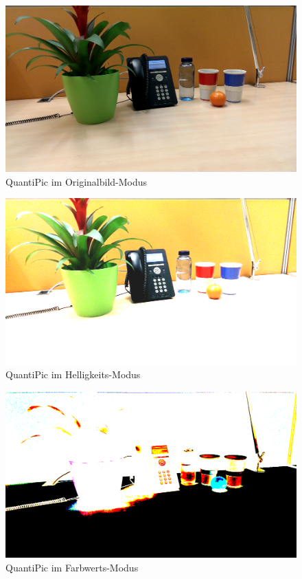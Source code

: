 \begin{landscape}
\begin{figure}[h]
	\centering
		\includegraphics[width=1.4\textwidth]{img/Fotos/QuantiPic_Original.png}
	\caption[QuantiPic Originalbild]{QuantiPic im Originalbild-Modus}
	\label{fig:quanti_orig}
\end{figure}

\begin{figure}[h]
	\centering
		\includegraphics[width=1.4\textwidth]{img/Fotos/QuantiPic_Helligkeit.png}
	\caption[QuantiPic Helligkeit]{QuantiPic im Helligkeits-Modus}
	\label{fig:quanti_hell}
\end{figure}

\begin{figure}[h]
	\centering
		\includegraphics[width=1.4\textwidth]{img/Fotos/QuantiPic_Farbwerte.png}
	\caption[QuantiPic Farbwerte]{QuantiPic im Farbwerts-Modus}
	\label{fig:quanti_farb}
\end{figure}





\end{landscape} 

